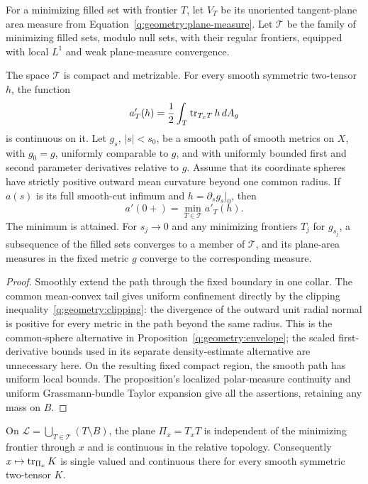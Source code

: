 For a minimizing filled set with frontier $T$, let $V_T$ be its
unoriented tangent-plane area measure from
Equation~\eqref{q:geometry:plane-measure}. Let $\mathcal T$ be the
family of minimizing filled sets, modulo null sets, with their
regular frontiers, equipped with local $L^1$ and weak plane-measure
convergence.

\begin{proposition}
\label{q4:enc:area-derivative}
The space $\mathcal T$ is compact and metrizable. For every smooth
symmetric two-tensor $h$, the function
\begin{equation}\label{q4:enc:metric-area-functional}
 a'_T(h)=\frac12\int_T\operatorname{tr}_{T_xT}h\,dA_g
\end{equation}
is continuous on it.
Let $g_s$, $|s|<s_0$, be a smooth path of smooth metrics on $X$,
with $g_0=g$, uniformly comparable to $g$, and with uniformly bounded
first and second parameter derivatives relative to $g$. Assume that
its coordinate spheres have strictly positive outward mean curvature
beyond one common radius. If $a(s)$ is its full smooth-cut infimum
and $h=\partial_sg_s|_0$, then
\begin{equation}\label{q4:enc:area-derivative-formula}
 a'(0+)=\min_{T\in\mathcal T}a'_T(h).
\end{equation}
The minimum is attained. For $s_j\to0$ and any minimizing frontiers
$T_j$ for $g_{s_j}$, a subsequence of the filled sets converges to a
member of $\mathcal T$, and its plane-area measures in the fixed
metric $g$ converge to the corresponding measure.
\end{proposition}

\begin{proof}
Smoothly extend the path through the fixed boundary in one collar.
The common mean-convex tail gives uniform confinement directly by
the clipping inequality~\eqref{q:geometry:clipping}: the divergence
of the outward unit radial normal is positive for every metric in
the path beyond the same radius. This is the common-sphere
alternative in Proposition~\ref{q:geometry:envelope}; the scaled
first-derivative bounds used in its separate density-estimate
alternative are unnecessary here. On the resulting fixed compact
region, the smooth path has uniform local bounds. The proposition's
localized polar-measure continuity and uniform Grassmann-bundle
Taylor expansion give all the assertions, retaining any mass on $B$.
\end{proof}

\begin{proposition}
\label{q4:enc:common-plane}
On $\mathcal L=\bigcup_{T\in\mathcal T}(T\setminus B)$, the plane
$\Pi_x=T_xT$ is independent of the minimizing frontier through $x$
and is continuous in the relative topology. Consequently
$x\mapsto\operatorname{tr}_{\Pi_x}K$ is single valued and continuous there for
every smooth symmetric two-tensor $K$.
\end{proposition}

